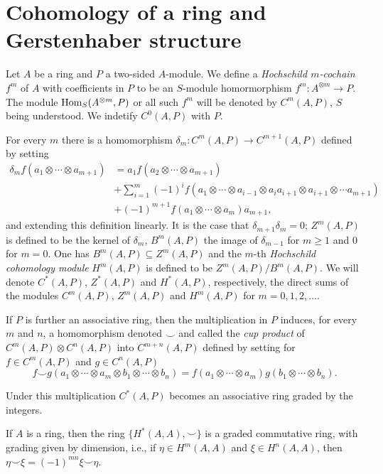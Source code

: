 \documentclass[TFM.tex]{subfiles}
\begin{document}
\section{Cohomology of a ring and Gerstenhaber structure}

\begin{defi}Let $A$ be a ring and $P$ a two-sided $A$-module. We define a \emph{Hochschild $m$-cochain} $f^m$ of $A$ with coefficients in $P$ to be an $S$-module homormorphism $f^m: A^{\otimes m}\to P$. The module $\operatorname{Hom}_S(A^{\otimes m}, P)$ or all such $f^m$ will be denoted by $C^m(A,P)$, $S$ being understood. We indetify $C^0(A,P)$ with $P$.
\end{defi}

For every $m$ there is a homomorphism $\delta_m: C^m(A,P)\to C^{m+1}(A,P)$ defined by setting
\begin{align*}
\delta_m f(a_1\otimes\cdots\otimes a_{m+1})&=a_1f(a_2\otimes\cdots\otimes a_{m+1})\\
& +\sum_{i=1}^m(-1)^if(a_1\otimes\cdots\otimes a_{i-1}\otimes a_ia_{i+1}\otimes a_{i+1}\otimes\cdots a_{m+1})\\
& +(-1)^{m+1}f(a_1\otimes\cdots\otimes a_m)a_{m+1},
\end{align*}
and extending this definition linearly. It is the case that $\delta_{m+1}\delta_m=0$; $Z^m(A,P)$ is defined to be the kernel of $\delta_m$, $B^m(A,P)$ the image of $\delta_{m-1}$ for $m\geq 1$ and 0 for $m=0$. One has $B^m(A,P)\subseteq Z^m(A,P)$ and the $m$-th \emph{Hochschild cohomology module} $H^m(A,P)$ is defined to be $Z^m(A,P)/B^m(A,P)$. We will denote $C^*(A,P)$, $Z^*(A,P)$ and $H^*(A,P)$, respectively, the direct sums of the modules $C^m(A,P)$, $Z^m(A,P)$ and $H^m(A,P)$ for $m=0,1,2,\dots$. 

If $P$ is further an associative ring, then the multiplication in $P$ induces, for every $m$ and $n$, a homomorphism denoted $\smile$ and called the \emph{cup product} of $C^m(A,P)\otimes C^n(A,P)$ into $C^{m+n}(A,P)$ defined by setting for $f\in C^m(A,P)$ and $g\in C^n(A,P)$
\[
f\smile g(a_1\otimes\cdots\otimes a_m\otimes b_1\otimes\cdots\otimes b_n)=f(a_1\otimes\cdots\otimes a_m)g(b_1\otimes\cdots\otimes b_n).
\]

Under this multiplication $C^*(A,P)$ becomes an associative ring graded by the integers.

\begin{thm}\cite[Corollary 1 of ]{Gerstenhaber}
If $A$ is a ring, then the ring $\{H^*(A,A),\smile\}$ is a graded commutative ring, with grading given by dimension, i.e., if $\eta\in H^m(A,A)$ and $\xi\in H^n(A,A)$, then $\eta\smile \xi =(-1)^{mn}\xi\smile \eta$.
\end{thm} 
\end{document}
